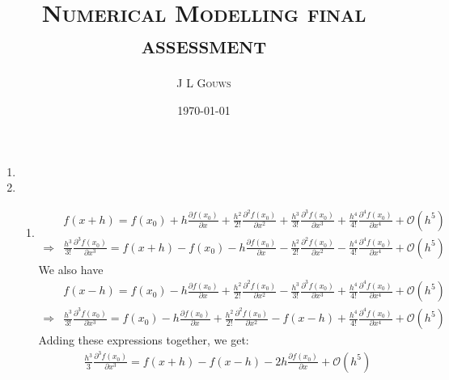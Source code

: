 \documentclass[12pt,a4]{article}
\title{
\textsc{Numerical Modelling final assessment}
}
\author{\textsc{J L Gouws}
}
\date{\today
\\[1cm]}
\begin{document}
\thispagestyle{empty}

\maketitle

\begin{enumerate}
  \item
  \item
    \begin{enumerate}
      \item
        \begin{align*}
                      & f(x + h) = f(x_0) + h \frac{\partial f(x_0)}{\partial x} + \frac{h^2}{2!} \frac{\partial^2 f(x_0)}{\partial x^2} + \frac{h^3}{3!} \frac{\partial^3 f(x_0)}{\partial x^3} + \frac{h^4}{4!} \frac{\partial^4 f(x_0)}{\partial x^4} + \mathscr{O}(h^5)\\ %
          \Rightarrow & \frac{h^3}{3!} \frac{\partial^3 f(x_0)}{\partial x^3} = f(x + h) - f(x_0) - h \frac{\partial f(x_0)}{\partial x} - \frac{h^2}{2!} \frac{\partial^2 f(x_0)}{\partial x^2} - \frac{h^4}{4!} \frac{\partial^4 f(x_0)}{\partial x^4} + \mathscr{O}(h^5) %
        \end{align*}
        We also have
        \begin{align*}
                      & f(x - h) = f(x_0) - h \frac{\partial f(x_0)}{\partial x} + \frac{h^2}{2!} \frac{\partial^2 f(x_0)}{\partial x^2} - \frac{h^3}{3!} \frac{\partial^3 f(x_0)}{\partial x^3} + \frac{h^4}{4!} \frac{\partial^4 f(x_0)}{\partial x^4} + \mathscr{O}(h^5)\\ %
          \Rightarrow & \frac{h^3}{3!} \frac{\partial^3 f(x_0)}{\partial x^3} = f(x_0) - h \frac{\partial f(x_0)}{\partial x} + \frac{h^2}{2!} \frac{\partial^2 f(x_0)}{\partial x^2} - f(x - h) + \frac{h^4}{4!} \frac{\partial^4 f(x_0)}{\partial x^4} + \mathscr{O}(h^5) %
        \end{align*}
        Adding these expressions together, we get:
        \begin{align}
          & \frac{h^3}{3} \frac{\partial^3 f(x_0)}{\partial x^3} = f(x + h) - f(x - h) - 2 h \frac{\partial f(x_0)}{\partial x} + \mathscr{O}(h^5) \label{eq:thirdDevFirst}%

\end{align}
\end{enumerate}
\end{enumerate}
\end{document}
